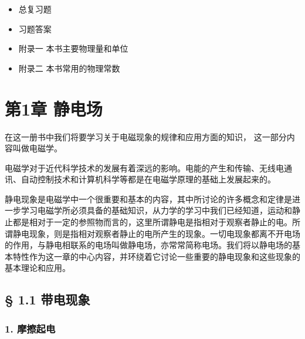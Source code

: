 \begin{itemize}
  \begin{itemize}
  \tightlist
  \item
    §7·1 电磁振荡和振荡电路
  \item
    §7·2 电磁场和电磁波
  \item
    §7·3 电磁波的发送
  \item
    §7·4 电磁波的接收
  \item
    §7·5 雷达、电视
  \item
    本章提要
  \item
    复习题七
  \item
    单元检查题（第6\textasciitilde7章）
  \end{itemize}
\item
  总复习题
\item
  习题答案
\item
  附录一 本书主要物理量和单位
\item
  附录二 本书常用的物理常数
\end{itemize}

\chapter{第1章 静电场}\label{ux7b2c1ux7ae0-ux9759ux7535ux573a}

在这一册书中我们将要学习关于电磁现象的规律和应用方面的知识，
这一部分内容叫做电磁学。

电磁学对于近代科学技术的发展有着深远的影响。电能的产生和传输、无线电通讯、自动控制技术和计算机科学等都是在电磁学原理的基础上发展起来的。

静电现象是电磁学中一个很重要和基本的内容，其中所讨论的许多概念和定律是进一步学习电磁学所必须具备的基础知识，从力学的学习中我们已经知道，运动和静止都是相对于一定的参照物而言的，这里所谓静电是指相对于观察者静止的电。所谓静电现象，则是指相对观察者静止的电所产生的现象。一切电现象都离不开电场的作用，与静电相联系的电场叫做静电场，亦常常简称电场。我们将以静电场的基本特性作为这一章的中心内容，并环绕着它讨论一些重要的静电现象和这些现象的基本理论和应用。

\section{§ 1.1 带电现象}\label{ux5e26ux7535ux73b0ux8c61}

\subsection{1. 摩擦起电}\label{ux6469ux64e6ux8d77ux7535}

